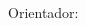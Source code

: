 
\begin{center}
	\begin{spacing}{1.0}
  	\large\bfseries\pfcAutor\par
  	\small\pfcEmail
  \end{spacing}
\end{center}
  
\vfill\vfill\vfill

\begin{spacing}{2}
	\begin{center}
	 	{\Huge\bfseries\slshape\pfcTitulo}
	\end{center}
\end{spacing}
   
\vspace{.8cm}

\hspace{.45\textwidth}
\begin{minipage}{.5\textwidth}
	\begin{spacing}{1}
		\pfcComentario
	\end{spacing}
\end{minipage}
     
\vspace{.8cm}

\begin{center}
Orientador:\vspace{1mm}\\
	\pfcOrientador
	\protect\\
	   \vspace{0.7cm}
\end{center}

\vfill

\begin{center}
	\begin{spacing}{1}
		\setlength{\parskip}{0cm}
			{\pfcInstFont\pfcInstituicao\par}
		\setlength{\parskip}{.3cm}\par
	\end{spacing}
\end{center}

\vfill\vfill

\begin{center}
	{\pfcLocal\par}
\end{center}
